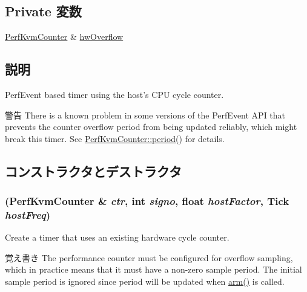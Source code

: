 \subsection*{Private 変数}
\begin{DoxyCompactItemize}
\item 
\hyperlink{classPerfKvmCounter}{PerfKvmCounter} \& \hyperlink{classPerfKvmTimer_af183dc3e77e7fc3603a0d4ff4a8fb65d}{hwOverflow}
\end{DoxyCompactItemize}


\subsection{説明}
PerfEvent based timer using the host's CPU cycle counter.

\begin{DoxyWarning}{警告}
There is a known problem in some versions of the PerfEvent API that prevents the counter overflow period from being updated reliably, which might break this timer. See \hyperlink{classPerfKvmCounter_a08ec1e452f32c7b0e573d63f126a2bbf}{PerfKvmCounter::period()} for details. 
\end{DoxyWarning}


\subsection{コンストラクタとデストラクタ}
\hypertarget{classPerfKvmTimer_a9435bd1cf661fdb4e35b2a733d94f92d}{
\subsubsection[{PerfKvmTimer}]{ ({\bf PerfKvmCounter} \& {\em ctr}, \/  int {\em signo}, \/  float {\em hostFactor}, \/  {\bf Tick} {\em hostFreq})}}
\label{classPerfKvmTimer_a9435bd1cf661fdb4e35b2a733d94f92d}
Create a timer that uses an existing hardware cycle counter.

\begin{DoxyNote}{覚え書き}
The performance counter must be configured for overflow sampling, which in practice means that it must have a non-\/zero sample period. The initial sample period is ignored since period will be updated when \hyperlink{classPerfKvmTimer_a5041ff590d50fcb1f0f5149b2e7eb4bb}{arm()} is called.
\end{DoxyNote}

